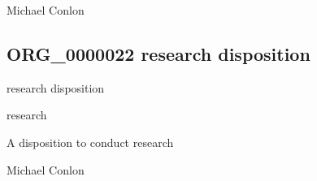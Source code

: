 \documentclass[letterpaper,10pt,english]{sphinxmanual}
\begin{document}
\begin{sphinxShadowBox}

\sphinxAtStartPar
Michael Conlon 
\end{sphinxShadowBox}
\begin{quote}

\ignorespaces \end{quote}


\subsection{ORG\_0000022 \sphinxhyphen{} research disposition}
\label{\detokenize{doc-ORG_0000022:org-0000022-research-disposition}}\label{\detokenize{doc-ORG_0000022:index-0}}\label{\detokenize{doc-ORG_0000022::doc}}
\begin{sphinxShadowBox}

\sphinxAtStartPar
research disposition
\end{sphinxShadowBox}

\begin{sphinxShadowBox}

\sphinxAtStartPar
research
\end{sphinxShadowBox}

\begin{sphinxShadowBox}

\sphinxAtStartPar
{\hyperref[\detokenize{doc-BFO_0000016::doc}]{}}
\end{sphinxShadowBox}

\begin{sphinxShadowBox}

\sphinxAtStartPar
A disposition to conduct research
\end{sphinxShadowBox}

\begin{sphinxShadowBox}

\sphinxAtStartPar
Michael Conlon 
\end{sphinxShadowBox}
\end{document}
